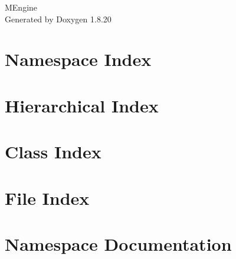 \let\mypdfximage\pdfximage\def\pdfximage{\immediate\mypdfximage}\documentclass[twoside]{book}
\newcommand{\+}{\discretionary{\mbox{\scriptsize$\hookleftarrow$}}{}{}}
\newcommand{\clearemptydoublepage}{%
  \newpage{\pagestyle{empty}\cleardoublepage}%
}
\begin{document}
\hypersetup{pageanchor=false,
             bookmarksnumbered=true,
             pdfencoding=unicode
            }
\begin{titlepage}
\vspace*{7cm}
\begin{center}%
{\Large M\+Engine }\\
\vspace*{1cm}
{\large Generated by Doxygen 1.8.20}\\
\end{center}
\end{titlepage}
\clearemptydoublepage
{}
\tableofcontents
\clearemptydoublepage
{}
\hypersetup{pageanchor=true}

\chapter{Namespace Index}

\chapter{Hierarchical Index}

\chapter{Class Index}

\chapter{File Index}

\chapter{Namespace Documentation}





\end{document}

